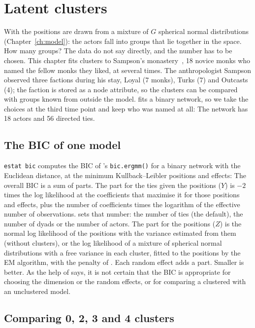 \chapter{Latent clusters}\label{ch:clusters}

With  the positions are drawn from a mixture of $G$ spherical normal distributions (Chapter~\ref{ch:model}): the actors fall into groups that lie together in the space. How many groups? The data do not say directly, and the number has to be chosen. This chapter fits clusters to Sampson's monastery~\cite{sampson1969}, 18 novice monks who named the fellow monks they liked, at several times. The anthropologist Sampson observed three factions during his stay, Loyal (7 monks), Turks (7) and Outcasts (4); the faction is stored as a node attribute, so the clusters can be compared with groups known from outside the model. \nwlsm{} fits a binary network, so we take the choices at the third time point and keep who was named at all:
The network has 18 actors and 56 directed ties.

\section{The BIC of one model}\label{sec:bic}

\texttt{estat bic} computes the BIC of \latentnet{}'s \texttt{bic.ergmm()} for a binary network with the Euclidean distance, at the minimum Kullback--Leibler positions and effects:
The overall BIC is a sum of parts. The part for the ties given the positions ($Y$) is $-2$ times the log likelihood at the coefficients that maximise it for those positions and effects, plus the number of coefficients times the logarithm of the effective number of observations.  sets that number: the number of ties (the default), the number of dyads or the number of actors. The part for the positions ($Z$) is the normal log likelihood of the positions with the variance estimated from them (without clusters), or the log likelihood of a mixture of  spherical normal distributions with a free variance in each cluster, fitted to the positions by the EM algorithm, with the penalty of \latentnet{}. Each random effect adds a part. Smaller is better. As the help of \latentnet{} says, it is not certain that the BIC is appropriate for choosing the dimension or the random effects, or for comparing a clustered with an unclustered model.

\section{Comparing 0, 2, 3 and 4 clusters}\label{sec:select}

